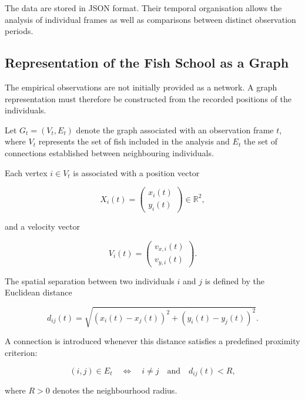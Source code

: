 \documentclass[10pt,a4paper]{article}
\begin{document}
The data are stored in JSON format. Their temporal
organisation allows the analysis of individual frames as
well as comparisons between distinct observation periods.

\subsection{Representation of the Fish School as a Graph}

The empirical observations are not initially provided as a
network. A graph representation must therefore be constructed
from the recorded positions of the individuals.

Let $G_t=(V_t,E_t)$ denote the graph associated with an
observation frame $t$, where $V_t$ represents the set of fish
included in the analysis and $E_t$ the set of connections
established between neighbouring individuals.

Each vertex $i \in V_t$ is associated with a position vector

\begin{equation}
X_i(t)=
\begin{pmatrix}
x_i(t)\\
y_i(t)
\end{pmatrix}
\in \mathbb{R}^{2},
\end{equation}

and a velocity vector

\begin{equation}
V_i(t)=
\begin{pmatrix}
v_{x,i}(t)\\
v_{y,i}(t)
\end{pmatrix}.
\end{equation}

The spatial separation between two individuals $i$ and $j$
is defined by the Euclidean distance

\begin{equation}
d_{ij}(t)=
\sqrt{
\left(x_i(t)-x_j(t)\right)^2+
\left(y_i(t)-y_j(t)\right)^2
}.
\end{equation}

A connection is introduced whenever this distance satisfies
a predefined proximity criterion:

\begin{equation}
(i,j)\in E_t
\quad\Longleftrightarrow\quad
i\neq j
\quad \text{and} \quad
d_{ij}(t)<R,
\end{equation}

where $R>0$ denotes the neighbourhood radius.
\end{document}
